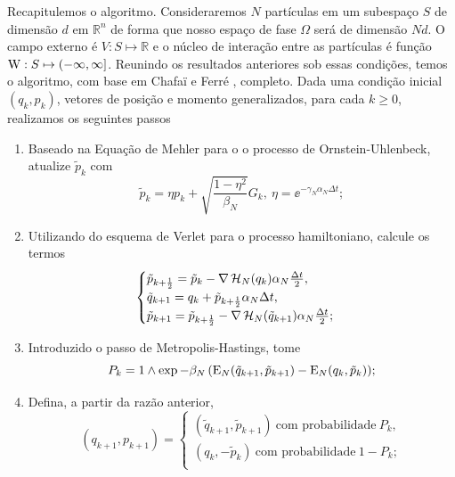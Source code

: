 \documentclass[12pt]{report}
\begin{document}
Recapitulemos o algoritmo. Consideraremos $N$ partículas em um subespaço $S$ de dimensão $d$ em $\mathbb{R}^n$ de forma que nosso espaço de fase $\Omega$ será de dimensão $Nd$. O campo externo é $V : S \mapsto \mathbb{R}$ e o núcleo de interação entre as partículas é função $\operatorname{W} : S \mapsto (-\infty, \infty]$. Reunindo os resultados anteriores sob essas condições, temos o algoritmo, com base em Chafa\"{i} e Ferré \cite{Chafa2018}, completo. Dada uma condição inicial $(q_k, p_k)$,  vetores de posição e momento generalizados, para cada $k\geq0$, realizamos os seguintes passos
\begin{enumerate}
	\item Baseado na Equação de Mehler para o o processo de Ornstein-Uhlenbeck, atualize $\tilde{p}_k$ com
	\begin{equation}
		\tilde{p}_k = \eta p_k + \sqrt{\frac{1-\eta^2}{\beta_N}} G_k, \ \eta = \ee^{-\gamma_N \alpha_N \Delta t};
		\label{Equation: Alg Mehler}
	\end{equation}
	\item Utilizando do esquema de Verlet para o processo hamiltoniano, calcule os termos
	\begin{equation}
		\begin{cases}
			\tilde{p}_{k+\frac{1}{2}} = \tilde{p}_k - \nabla \operatorname{\mathcal{H}}_N(q_k) \alpha_N \frac{\Delta t}{2}, \\
			\tilde{q}_{k+1} = q_k + \tilde{p}_{k + \frac{1}{2}} \alpha_N \Delta t, \\
			\tilde{p}_{k+1} = \tilde{p}_{k+\frac{1}{2}} - \nabla \operatorname{\mathcal{H}}_N(\tilde{q}_{k+1}) \alpha_N \frac{\Delta t}{2};
			\label{Equation: Alg Verlet}
		\end{cases}
	\end{equation}
	\item Introduzido o passo de Metropolis-Hastings, tome
	\begin{equation}
		P_k = 1 \wedge \exp{ -\beta_N \left(\operatorname{E}_N(\tilde{q}_{k+1}, \tilde{p}_{k+1}) - \operatorname{E}_N(q_{k}, \tilde{p}_{k}) \right)};
		\label{Equação: Alg Pk}
	\end{equation}
	\item Defina, a partir da razão anterior, 
	\begin{equation}
		(q_{k+1}, p_{k+1}) = 
		\begin{cases}
			(\tilde{q}_{k+1}, \tilde{p}_{k+1}) \ \text{com probabilidade} \ P_k, \\
			(q_k, -\tilde{p}_{k}) \ \text{com probabilidade} \ 1-P_k; \\
		\end{cases}
		\label{Equation: Alg Metro}
	\end{equation}
\end{enumerate}
\end{document}

